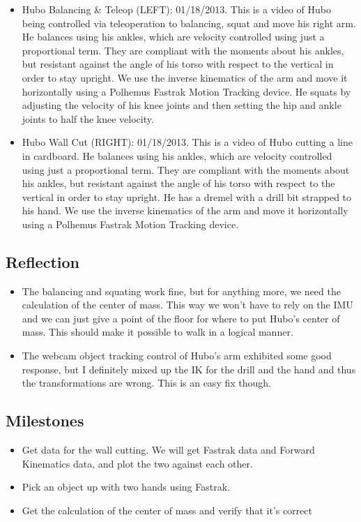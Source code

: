\documentclass[letterpaper, 10 pt]{report}
\begin{document}
\begin{itemize}
\item Hubo Balancing \& Teleop (LEFT): 01/18/2013. This is a video of Hubo being controlled via teleoperation to balancing, squat and move his right arm. He balances using his ankles, which are velocity controlled using just a proportional term. They are compliant with the moments about his ankles, but resistant against the angle of his torso with respect to the vertical in order to stay upright. We use the inverse kinematics of the arm and move it horizontally using a Polhemus Fastrak Motion Tracking device. He squats by adjusting the velocity of his knee joints and then setting the hip and ankle joints to half the knee velocity.
\item Hubo Wall Cut (RIGHT): 01/18/2013. This is a video of Hubo cutting a line in cardboard. He balances using his ankles, which are velocity controlled using just a proportional term. They are compliant with the moments about his ankles, but resistant against the angle of his torso with respect to the vertical in order to stay upright. He has a dremel with a drill bit strapped to his hand. We use the inverse kinematics of the arm and move it horizontally using a Polhemus Fastrak Motion Tracking device.
\end{itemize}

\subsection*{Reflection}
\begin{itemize}
\item The balancing and squating work fine, but for anything more, we need the calculation of the center of mass. This way we won't have to rely on the IMU and we can just give a point of the floor for where to put Hubo's center of mass. This should make it possible to walk in a logical manner.
\item The webcam object tracking control of Hubo's arm exhibited some good response, but I definitely mixed up the IK for the drill and the hand and thus the transformations are wrong. This is an easy fix though.
\end{itemize}

\subsection*{Milestones}
\begin{itemize}
\item Get data for the wall cutting. We will get Fastrak data and Forward Kinematics data, and plot the two against each other.
\item Pick an object up with two hands using Fastrak.
\item Get the calculation of the center of mass and verify that it's correct
\end{itemize}
\end{document}
